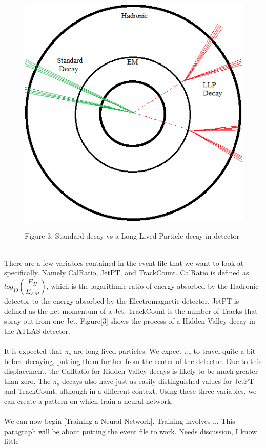 \documentclass[10pt,a4paper]{report}
\begin{document}
\begin{figure}
\includegraphics[scale=.4]{Figure3}
\begin{center}
{\scriptsize Figure 3: Standard decay vs a Long Lived Particle decay in detector}
\end{center}
\end{figure}

\noindent \\There are a few variables contained in the event file that we want to look at specifically. Namely CalRatio, JetPT, and TrackCount. CalRatio is defined as $log_{10}(\dfrac{E_H}{E_{EM}})$, which is the logarithmic ratio of energy absorbed by the Hadronic detector to the energy absorbed by the Electromagnetic detector. JetPT is defined as the net momentum of a Jet. TrackCount is the number of Tracks that spray out from one Jet. Figure[3] shows the process of a Hidden Valley decay in the ATLAS detector.\\\\
It is expected that $\pi_s$ are long lived particles. We expect $\pi_s$ to travel quite a bit before decaying, putting them further from the center of the detector. Due to this displacement, the CalRatio for Hidden Valley decays is likely to be much greater than zero. The $\pi_s$ decays also have just as easily distinguished values for JetPT and TrackCount, although in a different context. Using these three variables, we can create a pattern on which train a neural network.\\\\
We can now begin [Training a Neural Network]. Training involves ... This paragraph will be about putting the event file to work. Needs discussion, I know little
\end{document}
